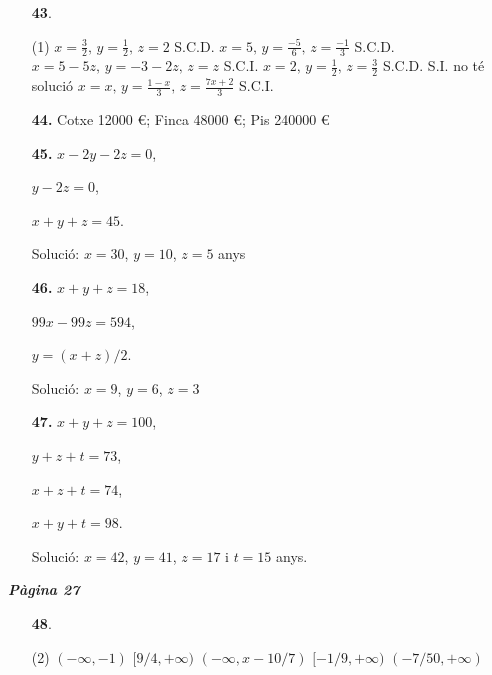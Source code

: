 \documentclass[a4paper, pdf, twoside]{book}
\begin{document}
\begin{multicols}{2}
\begin{enumerate}

 \item[\fontfamily{phv}\selectfont\color{blue}\textbf{43}. ] 
 \begin{tasks}[column-sep=1em, item-indent=1.3333em](1)
	 \task  $x=\frac {3}{2},\,y=\frac {1}{2},\,z=2$ S.C.D.
	 \task $x=5,\,y=\frac {-5}{6},\,z=\frac {-1}{3}$ S.C.D.
	 \task $x=5-5z,\,y=-3-2z,\,z=z$ S.C.I.
	 \task $x=2,\,y=\frac {1}{2},\,z=\frac {3}{2}$ S.C.D.
	 \task S.I. no té solució
	 \task $x=x,\,y=\frac {1-x}{3},\,z=\frac {7x+2}{3}$ S.C.I. 
\end{tasks}
\vspace{0.25cm}
\item[\fontfamily{phv}\selectfont\color{blue}\textbf{44. }] 
Cotxe 12000 \euro {}; Finca 48000 \euro {}; Pis 240000 \euro {}
\vspace{0.25cm}
\item[\fontfamily{phv}\selectfont\color{blue}\textbf{45. }] 
$x-2y-2z=0$,\par $y-2z=0$,\par $x+y+z=45$.\par Solució: $x=30$, $y=10$, $z=5$ anys
\vspace{0.25cm}
\item[\fontfamily{phv}\selectfont\color{blue}\textbf{46. }] 
$x+y+z=18$,\par $99x-99z=594$,\par $y=(x+z)/2$.\par Solució: $x=9$, $y=6$, $z=3$
\vspace{0.25cm}
\item[\fontfamily{phv}\selectfont\color{blue}\textbf{47. }] 
$x+y+z=100$,\par $y+z+t=73$,\par $x+z+t=74$,\par $x+y+t=98$.\par Solució: $x=42$, $y=41$, $z=17$ i $t=15$ anys.
 \end{enumerate}
\vspace{0.3cm}


{\textbf{\em Pàgina 27}} \hrulefill
\begin{enumerate}
\vspace{0.25cm}



 \item[\fontfamily{phv}\selectfont\color{blue}\textbf{48}. ] 
 \begin{tasks}[column-sep=1em, item-indent=1.3333em](2)
	 \task $(-\infty ,-1)$
	 \task $[9/4,+\infty )$
	 \task $(-\infty ,x-10/7)$
	 \task $[-1/9,+\infty )$
	 \task $(-7/50,+\infty )$
\end{tasks}
 \end{enumerate}
\begin{enumerate}
\vspace{0.25cm}



\end{enumerate}
\end{multicols}
\end{document}
